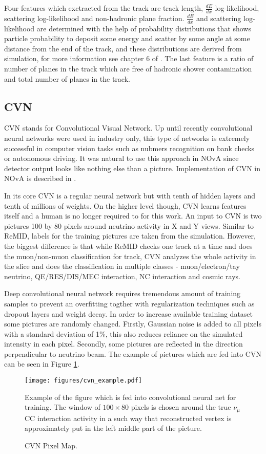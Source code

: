 Four features which exctracted from the track are track length, $\frac{dE}{dx}$ log-likelihood, scattering 
log-likelihood and non-hadronic plane fraction. $\frac{dE}{dx}$ and scattering log-likelihood are determined with 
the help of probability distributions that shows particle probability to deposit some energy and scatter by some 
angle at some distance from the end of the track, and these distributions are derived from simulation, for more 
information see chapter 6 of \cite{Nick}. The last feature is a ratio of number of planes in the track which are 
free of hadronic shower contamination and total number of planes in the track. 

\subsection{CVN}
CVN stands for Convolutional Visual Network. Up until recently convolutional neural networks were used in industry
only, this type of networks is extremely successful in computer vision tasks such as nubmers recognition on bank 
checks or autonomous driving. It was natural to use this approach in NOvA since detector output looks like nothing
else than a picture. Implementation of CVN in NOvA is described in \cite{CVN}.

In its core CVN is a regular neural network but with tenth of hidden layers and tenth of millions of weights. 
On the higher level though, CVN learns features itself and a human is no longer required to for this work.
An input to CVN is two pictures 100 by 80 pixels around neutrino activity in X and Y views. Similar to ReMID, labels 
for the training pictures are taken from the simulation. However, the biggest difference is that while ReMID checks
one track at a time and does the muon/non-muon classification for track, CVN analyzes the whole activity in the 
slice and does the classification in multiple classes - muon/electron/tay neutrino, QE/RES/DIS/MEC interaction, 
NC interaction and cosmic rays.

Deep convolutional neural network requires tremendous amount of training samples to prevent an overfitting togther 
with regularization  techniques such as dropout layers and weight decay. In order to increase available 
training dataset some pictures are randomly changed. Firstly, Gaussian noise is added to all pixels with a standard 
deviation of 1$\%$, this also reduces reliance on the simulated intensity in each pixel. Secondly, some pictures 
are reflected in the direction perpendicular to neutrino beam. The example of pictures which are fed into CVN can
be seen in Figure \ref{fig:cvn_example}.
\begin{figure}[h]
\texttt{[image: figures/cvn\_example.pdf]}
\centering
\caption{CVN Pixel Map.}
{Example of the figure which is fed into convolutional neural net for training. The window of $100\times80$ 
pixels is chosen around the true $\nu_\mu$ CC interaction activity in a such way that reconstructed vertex is 
approximately put in the left middle part of the picture.}
\label{fig:cvn_example}
\end{figure}

